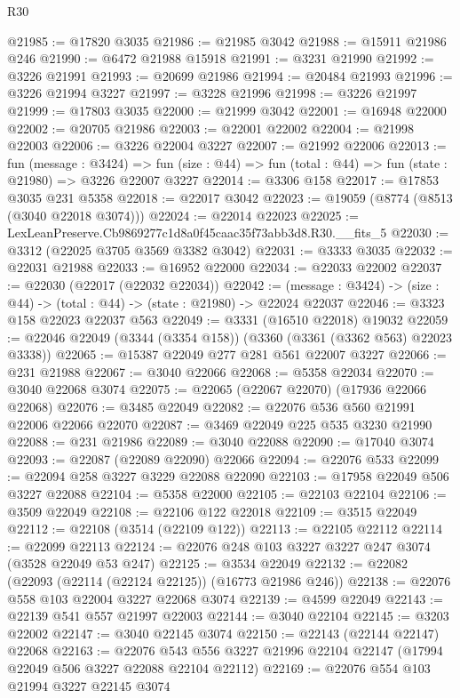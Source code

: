\begin{lexlean}{R30}
\begin{coremodule}
@21985 := @17820 @3035
@21986 := @21985 @3042
@21988 := @15911 @21986 @246
@21990 := @6472 @21988 @15918
@21991 := @3231 @21990
@21992 := @3226 @21991
@21993 := @20699 @21986
@21994 := @20484 @21993
@21996 := @3226 @21994 @3227
@21997 := @3228 @21996
@21998 := @3226 @21997
@21999 := @17803 @3035
@22000 := @21999 @3042
@22001 := @16948 @22000
@22002 := @20705 @21986
@22003 := @22001 @22002
@22004 := @21998 @22003
@22006 := @3226 @22004 @3227
@22007 := @21992 @22006
@22013 := fun (message : @3424) =>
  fun (size : @44) => fun (total : @44) => fun (state : @21980) => @3226 @22007 @3227
@22014 := @3306 @158
@22017 := @17853 @3035 @231 @5358
@22018 := @22017 @3042
@22023 := @19059 (@8774 (@8513 (@3040 @22018 @3074)))
@22024 := @22014 @22023
@22025 := LexLeanPreserve.Cb9869277c1d8a0f45caac35f73abb3d8.R30.__fits_5
@22030 := @3312 (@22025 @3705 @3569 @3382 @3042)
@22031 := @3333 @3035
@22032 := @22031 @21988
@22033 := @16952 @22000
@22034 := @22033 @22002
@22037 := @22030 (@22017 (@22032 @22034))
@22042 := (message : @3424) -> (size : @44) -> (total : @44) -> (state : @21980) -> @22024 @22037
@22046 := @3323 @158 @22023 @22037 @563
@22049 := @3331 (@16510 @22018) @19032
@22059 := @22046 @22049 (@3344 (@3354 @158)) (@3360 (@3361 (@3362 @563) @22023 @3338))
@22065 := @15387 @22049 @277 @281 @561 @22007 @3227
@22066 := @231 @21988
@22067 := @3040 @22066
@22068 := @5358 @22034
@22070 := @3040 @22068 @3074
@22075 := @22065 (@22067 @22070) (@17936 @22066 @22068)
@22076 := @3485 @22049
@22082 := @22076 @536 @560 @21991 @22006 @22066 @22070
@22087 := @3469 @22049 @225 @535 @3230 @21990
@22088 := @231 @21986
@22089 := @3040 @22088
@22090 := @17040 @3074
@22093 := @22087 (@22089 @22090) @22066
@22094 := @22076 @533
@22099 := @22094 @258 @3227 @3229 @22088 @22090
@22103 := @17958 @22049 @506 @3227 @22088
@22104 := @5358 @22000
@22105 := @22103 @22104
@22106 := @3509 @22049
@22108 := @22106 @122 @22018
@22109 := @3515 @22049
@22112 := @22108 (@3514 (@22109 @122))
@22113 := @22105 @22112
@22114 := @22099 @22113
@22124 := @22076 @248 @103 @3227 @3227 @247 @3074 (@3528 @22049 @53 @247)
@22125 := @3534 @22049
@22132 := @22082 (@22093 (@22114 (@22124 @22125)) (@16773 @21986 @246))
@22138 := @22076 @558 @103 @22004 @3227 @22068 @3074
@22139 := @4599 @22049
@22143 := @22139 @541 @557 @21997 @22003
@22144 := @3040 @22104
@22145 := @3203 @22002
@22147 := @3040 @22145 @3074
@22150 := @22143 (@22144 @22147) @22068
@22163 := @22076
    @543
    @556
    @3227
    @21996
    @22104
    @22147
    (@17994 @22049 @506 @3227 @22088 @22104 @22112)
@22169 := @22076 @554 @103 @21994 @3227 @22145 @3074

\end{coremodule}
\end{lexlean}
